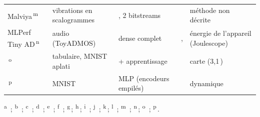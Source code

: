 \begin{table}[!htbp]
\begin{tabularx}{\textwidth}{@{}P{2.6cm}P{3.1cm}LP{2cm}P{2.4cm}@{}}
Malviya\,\textsuperscript{m} & vibrations en scalogrammes & , 2 bitstreams &  & méthode non décrite \\
MLPerf Tiny AD\,\textsuperscript{n} & audio (ToyADMOS) &  dense complet & ,  & énergie de l'appareil (Joulescope) \\
\,\textsuperscript{o} & tabulaire, MNIST aplati &   + apprentissage &  & carte (3,1\,) \\
\,\textsuperscript{p} & MNIST & MLP (encodeurs empilés) &  & dynamique \\
\bottomrule
\end{tabularx}

\smallskip\raggedright\footnotesize
\textsuperscript{a}\,\citet{arxiv-2108.03986-autoencoders-fpgas-real-time-unsupervised} ;
\textsuperscript{b}\,\citet{arxiv-2602.15751-enabling-low-latency-machine-learning} ;
\textsuperscript{c}\,\citet{2024-que-low-latency-variational-autoencoder-fpgas} ;
\textsuperscript{d}\,\citet{2024-campos-end-end-codesign-hessian-aware} ;
\textsuperscript{e}\,\citet{arxiv-2411.01118-variational-autoencoders-source-data-reduction} ;
\textsuperscript{f}\,\citet{2022-sun-f-lic-fpga-learned-image} ;
\textsuperscript{g}\,\citet{arxiv-2503.04832-lightweight-embedded-fpga-deployment-learned}\pp ;
\textsuperscript{h}\,\citet{arxiv-2511.17135-multi-stage-optimization-framework-deploying}\pp ;
\textsuperscript{i}\,\citet{2023-guerrisi-artificial-intelligence-board-image-compression} ;
\textsuperscript{j}\,\citet{2021-manjunath-energy-efficient-edgeai-autoencoder-accelerator} ;
\textsuperscript{k}\,\citet{arxiv-2301.07050-energy-efficient-reconfigurable-autoencoder-implementation}\pp ;
\textsuperscript{l}\,\citet{arxiv-2407.17647-energy-efficient-artefact-detection-accelerator} ;
\textsuperscript{m}\,\citet{2022-malviya-edge-compatible-convolutional-autoencoder-implemented} ;
\textsuperscript{n}\,\citet{arxiv-2206.11791-open-source-fpga-ml-codesign}\pp ;
\textsuperscript{o}\,\citet{2019-tsukada-neural-network-device-learning-anomaly} ;
\textsuperscript{p}\,\citet{2019-coutinho-deep-neural-network-hardware-implementation}.
\end{table}


